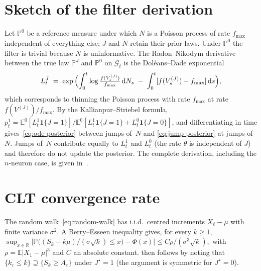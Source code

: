 \documentclass[11pt,a4paper]{article}
\theoremstyle{definition}
\newcommand{\R}{\mathbb{R}}
\newcommand{\E}{\mathbb{E}}
\newcommand{\Prob}{\mathbb{P}}
\newcommand{\Ind}{\mathbf{1}}
\newcommand{\cG}{\mathcal{G}}
\begin{document}



\appendix

\section{Sketch of the filter derivation}
\label{app:filter}

Let $\Prob^0$ be a reference measure under which $N$ is a Poisson
process of rate $f_{\max}$ independent of everything else; $J$ and
$\widetilde N$ retain their prior laws. Under $\Prob^0$ the filter is
trivial because $N$ is uninformative. The Radon--Nikodym derivative
between the true law $\Prob^J$ and $\Prob^0$ on $\cG_t$ is the
Dol\'eans--Dade exponential
\begin{equation*}
    L_t^J \;=\; \exp\,\Bigl(
        \int_0^t \log \tfrac{f(V_s^{(J)})}{f_{\max}} \,\mathrm{d} N_s
        \;-\; \int_0^t [f(V_s^{(J)}) - f_{\max}] \,\mathrm{d} s
    \Bigr),
\end{equation*}
which corresponds to thinning the Poisson process with rate
$f_{\max}$ at rate $f(V^{(J)})/f_{\max}$. By the Kallianpur--Striebel
formula,
$p_t^1 = \E^0[L_t^1 \Ind\{J = 1\}] / \E^0[L_t^1 \Ind\{J=1\} +
L_t^0 \Ind\{J=0\}]$, and differentiating in time gives~\eqref{eq:ode-posterior}
between jumps of~$N$ and \eqref{eq:jump-posterior} at jumps of~$N$. Jumps
of~$\widetilde N$ contribute equally to $L_t^1$ and $L_t^0$ (the rate
$\theta$ is independent of $J$) and therefore do not update the
posterior. The complete derivation, including the $n$-neuron case, is
given in~.

\section{CLT convergence rate}
\label{app:clt}

The random walk~\eqref{eq:random-walk} has i.i.d.\ centred increments
$X_\ell - \mu$ with finite variance $\sigma^2$. A Berry--Esseen
inequality gives, for every $k \geq 1$,
$
    \sup_{x \in \R} \bigl| \Prob\bigl( (S_k - k \mu)/(\sigma \sqrt k)
    \leq x \bigr) - \Phi(x) \bigr|
    \leq C \rho / (\sigma^3 \sqrt k),
$
with $\rho = \E |X_1 - \mu|^3$ and $C$ an absolute constant.
 then follows by noting that
$\{k_\varepsilon \leq k\} \supseteq \{S_k \geq A_\varepsilon\}$ under
$J^\star = 1$ (the argument is symmetric for $J^\star = 0$).
\end{document}
